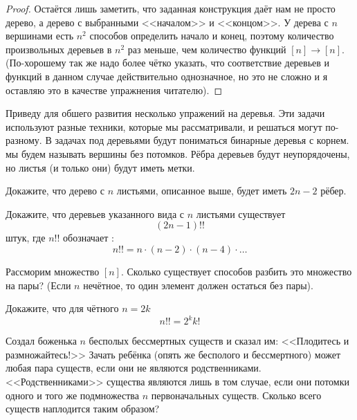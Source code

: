 \begin{proof}
Остаётся лишь заметить, что заданная конструкция даёт нам не просто дерево, а дерево с выбранными <<началом>> и <<концом>>. У дерева с $n$ вершинами есть $n^2$ способов определить начало и конец, поэтому количество произвольных деревьев в $n^2$ раз меньше, чем количество функций $[n]\to[n]$. (По-хорошему так же надо более чётко указать, что соответствие деревьев и функций в данном случае действительно однозначное, но это не сложно и я оставляю это в качестве упражнения читателю).
\end{proof}

Приведу для обшего развития несколько упражений на деревья. Эти задачи используют разные техники, которые мы рассматривали, и решаться могут по-разному. В задачах под деревьями будут пониматься бинарные деревья с корнем.  мы будем называть вершины без потомков. Рёбра деревьев будут неупорядочены, но листья (и только они) будут иметь метки.

\begin{exercise}
Докажите, что дерево с $n$ листьями, описанное выше, будет иметь $2n-2$ рёбер.
\end{exercise}

\begin{exercise}
Докажите, что деревьев указанного вида с $n$ листьями существует
$$(2n - 1)!!$$
штук, где $n!!$ обозначает :
$$n!! = n\cdot (n-2) \cdot (n-4) \cdot\ldots$$
\end{exercise}

\begin{exercise}
Рассморим множество $[n]$. Сколько существует способов разбить это множество на пары? (Если $n$ нечётное, то один элемент должен остаться без пары).
\end{exercise}

\begin{exercise}
Докажите, что для чётного $n=2k$
$$n!! = 2^kk!$$
\end{exercise}

\begin{exercise}
Создал боженька $n$ бесполых бессмертных существ и сказал им: <<Плодитесь и размножайтесь!>> Зачать ребёнка (опять же бесполого и бессмертного) может любая пара существ, если они не являются родственниками. <<Родственниками>> существа являются лишь в том случае, если они потомки одного и того же подмножества $n$ первоначальных существ. Сколько всего существ наплодится таким образом? 
\end{exercise}
